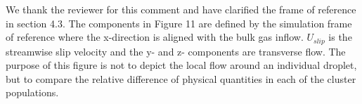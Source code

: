 \documentclass[11pt]{article}
\begin{document}
We thank the reviewer for this comment and have clarified the frame of reference in section 4.3. The components in Figure 11 are defined by the simulation frame of reference where the x-direction is aligned with the bulk gas inflow. $U_{slip}$ is the streamwise slip velocity and the y- and z- components are transverse flow. The purpose of this figure is not to depict the local flow around an individual droplet, but to compare the relative difference of physical quantities in each of the cluster populations.
\end{document}

